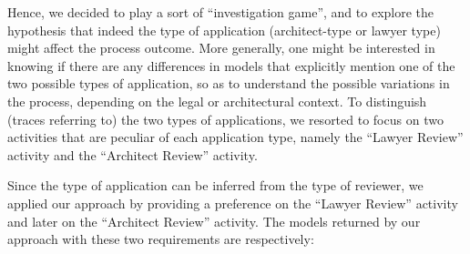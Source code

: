 Hence, we decided to play a sort of ``investigation game'', and to explore the hypothesis that indeed the type of application (architect-type or lawyer type) might affect the process outcome. More generally, one might be interested in knowing if there are any differences in models that explicitly mention one of the two possible types of application, so as to understand the possible variations in the process, depending on the legal or architectural context. To distinguish (traces referring to) the two types of applications, we resorted to focus on two activities that are peculiar of each application type, namely the “Lawyer Review” activity and the “Architect Review” activity.


Since the type of application can be inferred from the type of reviewer, we applied our approach by providing a preference on the “Lawyer Review” activity and later on the “Architect Review” activity.
%
The models returned by our approach with these two requirements are respectively:

